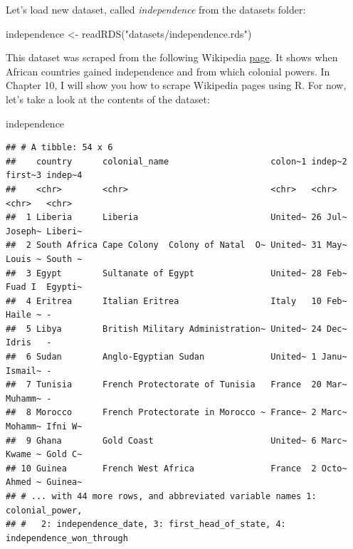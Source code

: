 \documentclass[
]{article}
\newenvironment{Shaded}{\begin{snugshade}}{\end{snugshade}}
\newcommand{\FunctionTok}[1]{\textcolor[rgb]{0.00,0.00,0.00}{#1}}
\newcommand{\NormalTok}[1]{#1}
\newcommand{\OtherTok}[1]{\textcolor[rgb]{0.56,0.35,0.01}{#1}}
\newcommand{\StringTok}[1]{\textcolor[rgb]{0.31,0.60,0.02}{#1}}
\begin{document}
Let's load new dataset, called \emph{independence} from the datasets folder:

\begin{Shaded}
\begin{Highlighting}[]
\NormalTok{independence }\OtherTok{\textless{}{-}} \FunctionTok{readRDS}\NormalTok{(}\StringTok{"datasets/independence.rds"}\NormalTok{)}
\end{Highlighting}
\end{Shaded}

This dataset was scraped from the following Wikipedia \href{https://en.wikipedia.org/wiki/Decolonisation_of_Africa\#Timeline}{page}.
It shows when African countries gained independence and from which colonial powers. In Chapter 10, I
will show you how to scrape Wikipedia pages using R. For now, let's take a look at the contents
of the dataset:

\begin{Shaded}
\begin{Highlighting}[]
\NormalTok{independence}
\end{Highlighting}
\end{Shaded}

\begin{verbatim}
## # A tibble: 54 x 6
##    country      colonial_name                    colon~1 indep~2 first~3 indep~4
##    <chr>        <chr>                            <chr>   <chr>   <chr>   <chr>  
##  1 Liberia      Liberia                          United~ 26 Jul~ Joseph~ Liberi~
##  2 South Africa Cape Colony  Colony of Natal  O~ United~ 31 May~ Louis ~ South ~
##  3 Egypt        Sultanate of Egypt               United~ 28 Feb~ Fuad I  Egypti~
##  4 Eritrea      Italian Eritrea                  Italy   10 Feb~ Haile ~ -      
##  5 Libya        British Military Administration~ United~ 24 Dec~ Idris   -      
##  6 Sudan        Anglo-Egyptian Sudan             United~ 1 Janu~ Ismail~ -      
##  7 Tunisia      French Protectorate of Tunisia   France  20 Mar~ Muhamm~ -      
##  8 Morocco      French Protectorate in Morocco ~ France~ 2 Marc~ Mohamm~ Ifni W~
##  9 Ghana        Gold Coast                       United~ 6 Marc~ Kwame ~ Gold C~
## 10 Guinea       French West Africa               France  2 Octo~ Ahmed ~ Guinea~
## # ... with 44 more rows, and abbreviated variable names 1: colonial_power,
## #   2: independence_date, 3: first_head_of_state, 4: independence_won_through
\end{verbatim}
\end{document}
